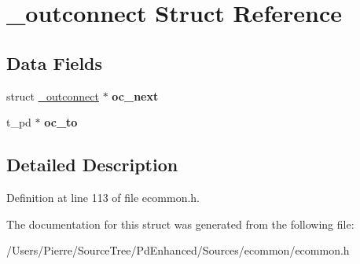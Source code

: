 \hypertarget{struct__outconnect}{\section{\-\_\-outconnect Struct Reference}
\label{struct__outconnect}
}
\subsection*{Data Fields}
\begin{DoxyCompactItemize}
\item 
\hypertarget{struct__outconnect_adbea08b41c0c8fe91283ea49fc0d4cfc}{struct \hyperlink{struct__outconnect}{\-\_\-outconnect} $\ast$ {\bfseries oc\-\_\-next}}\label{struct__outconnect_adbea08b41c0c8fe91283ea49fc0d4cfc}

\item 
\hypertarget{struct__outconnect_a9883a86f4e61a89103c9b67a9b415385}{t\-\_\-pd $\ast$ {\bfseries oc\-\_\-to}}\label{struct__outconnect_a9883a86f4e61a89103c9b67a9b415385}

\end{DoxyCompactItemize}


\subsection{Detailed Description}


Definition at line 113 of file ecommon.\-h.



The documentation for this struct was generated from the following file\-:\begin{DoxyCompactItemize}
\item 
/\-Users/\-Pierre/\-Source\-Tree/\-Pd\-Enhanced/\-Sources/ecommon/ecommon.\-h\end{DoxyCompactItemize}
